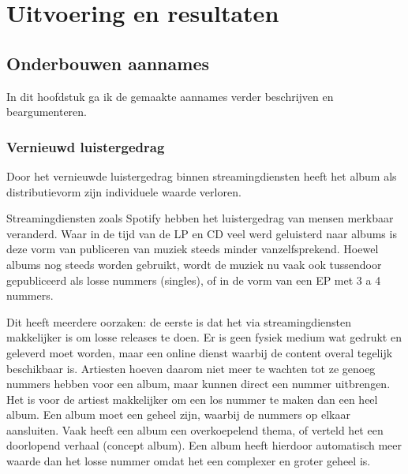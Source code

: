\section{Uitvoering en resultaten}

\subsection{Onderbouwen aannames}

In dit hoofdstuk ga ik de gemaakte aannames verder beschrijven en beargumenteren.

\subsubsection*{Vernieuwd luistergedrag}

\begin{quotebox}
Door het vernieuwde luistergedrag binnen streamingdiensten heeft het album als distributievorm zijn individuele waarde verloren.
\end{quotebox}

Streamingdiensten zoals Spotify hebben het luistergedrag van mensen merkbaar veranderd. Waar in de tijd van de LP en CD veel werd geluisterd naar albums is deze vorm van publiceren van muziek steeds minder vanzelfsprekend. Hoewel albums nog steeds worden gebruikt, wordt de muziek nu vaak ook tussendoor gepubliceerd als losse nummers (singles), of in de vorm van een EP met 3 a 4 nummers.

Dit heeft meerdere oorzaken: de eerste is dat het via streamingdiensten makkelijker is om losse releases te doen. Er is geen fysiek medium wat gedrukt en geleverd moet worden, maar een online dienst waarbij de content overal tegelijk beschikbaar is. Artiesten hoeven daarom niet meer te wachten tot ze genoeg nummers hebben voor een album, maar kunnen direct een nummer uitbrengen. Het is voor de artiest makkelijker om een los nummer te maken dan een heel album. Een album moet een geheel zijn, waarbij de nummers op elkaar aansluiten. Vaak heeft een album een overkoepelend thema, of verteld het een doorlopend verhaal (concept album). Een album heeft hierdoor automatisch meer waarde dan het losse nummer omdat het een complexer en groter geheel is.

